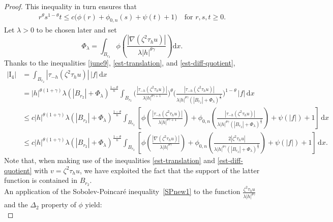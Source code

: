 \documentclass[leqno,11pt]{amsart}%
\numberwithin{equation}{section}
\def\d{\mathrm{d}}
\def\dx{\d x}
\theoremstyle{definition}
\numberwithin{equation}{section}
\begin{document}
\begin{proof}
This inequality in turn ensures that
\begin{align}
    \label{june9}
    r^{{\theta}}s^{{1-\theta}}t \leq c\big( \phi (r) +  \phi_{0,n} (s) + \psi (t) + 1\big) \quad \text{for $r,s,t \geq 0$.}
\end{align}
Let $\lambda>0$ to be chosen later and 
set
\begin{equation*}
  \Phi_\lambda =\int_{B_{r_2}} \phi\left(\frac{|\nabla (\zeta^2\tau_h u)|}{\lambda|h|^{ {\theta\gamma}}}\right)\dx.
\end{equation*}
Thanks to the inequalities  \eqref{june9}, \eqref{est-translation}, and \eqref{est-diff-quotient},
\begin{align}\label{est-RHS-psi}
|\mathrm{I}_4|&=\int_{B_{r_2}}|\tau_{-h}(\zeta^2\tau_hu)|\,|f|\,\dx\\ \nonumber
    &=
      |h|^{\theta(1+\gamma)}\lambda (|B_{r_2}| +\Phi_\lambda)^{\frac{{1-\theta}}{n}}
      \int_{B_{r_2}}\Big(\frac{|\tau_{-h}(\zeta^2\tau_hu)|}{\lambda|h|^{ {\theta\gamma+1}}}\Big)^{\theta}\Big(\frac{|\tau_{-h}(\zeta^2\tau_hu)|}{\lambda|h|^{ {\theta\gamma}}(|B_{r_2}|  +\Phi_\lambda)^{\frac{1}{n}}}\Big)^{1-\theta}\,|f|\,\dx\\ \nonumber  
    &\le c
     |h|^{\theta(1+\gamma)}\lambda (|B_{r_2}| +\Phi_\lambda)^{\frac{{1-\theta}}{n}}
      \int_{B_{r_2}}
      \left[\phi\left(\frac{|\tau_{-h}(\zeta^2\tau_hu)|}{\lambda|h|^{ {\theta\gamma+1}}}\right)
+ \phi_{0,n}\left(\frac{|\tau_{-h}(\zeta^2\tau_hu)|}{\lambda|h|^{ {{\theta\gamma}}}(|B_{r_2}| +\Phi_\lambda)^{\frac{1}{n}}}\right)
     +
     \psi(|f|) + 1\right]\,\dx \\
     \nonumber
 &\le
    c|h|^{\theta(1+\gamma)}\lambda (|B_{r_2}| +\Phi_\lambda)^{\frac{{1-\theta}}{n}} 
    \int_{B_{r_2}}
\left[\phi\left(\frac{|\nabla(\zeta^2\tau_hu)|}{\lambda|h|^{ {\theta\gamma}}}\right)
+ \phi_{0,n}\left(\frac{{ 2}|\zeta^2\tau_hu|}{\lambda|h|^{ {\theta\gamma}}(|B_{r_2}| +\Phi_\lambda)^{\frac{1}{n}}}\right)   +
    \psi(|f|) + 1\right]\,\dx.
  \end{align}
  Note that, when making use of the inequalities \eqref{est-translation} and \eqref{est-diff-quotient} with $v=\zeta^2\tau_hu$, we have exploited the fact that the support of the latter function is contained in $B_{r_2}$.
 \\
  An application of the Sobolev-Poincar\'e
inequality~\eqref{SPnew1} to the function $\frac{\zeta^2\tau_h u}{\lambda|h|^{{{\theta}\gamma}}}$ and the $\Delta_2$ property of $\phi$ yield:
  \begin{equation}\label{july39}

\end{equation}
\end{proof}
\end{document}
